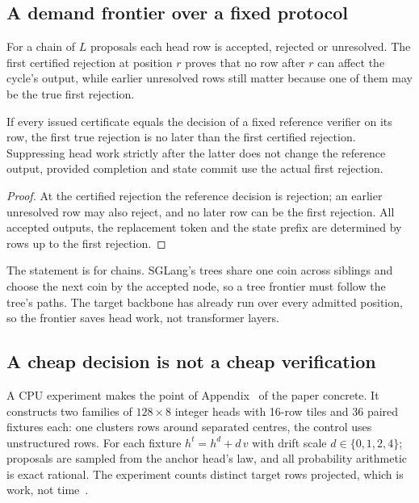 \subsection{A demand frontier over a fixed protocol}\label{app:frontier}\label{sec:frontier}
For a chain of $L$ proposals each head row is accepted, rejected or unresolved. The first certified rejection at position $r$ proves that no row after $r$ can affect the cycle's output, while earlier unresolved rows still matter because one of them may be the true first rejection.
\begin{proposition}\label{prop:frontier}
If every issued certificate equals the decision of a fixed reference verifier on its row, the first true rejection is no later than the first certified rejection. Suppressing head work strictly after the latter does not change the reference output, provided completion and state commit use the actual first rejection.
\end{proposition}
\begin{proof}
At the certified rejection the reference decision is rejection; an earlier unresolved row may also reject, and no later row can be the first rejection. All accepted outputs, the replacement token and the state prefix are determined by rows up to the first rejection.
\end{proof}
The statement is for chains. SGLang's trees share one coin across siblings and choose the next coin by the accepted node, so a tree frontier must follow the tree's paths. The target backbone has already run over every admitted position, so the frontier saves head work, not transformer layers.

\subsection{A cheap decision is not a cheap verification}\label{app:synthetic}\label{sec:synthetic}
A CPU experiment makes the point of Appendix~ of the paper concrete. It constructs two families of $128\times8$ integer heads with 16-row tiles and 36 paired fixtures each: one clusters rows around separated centres, the control uses unstructured rows. For each fixture $h^t=h^d+d\,v$ with drift scale $d\in\{0,1,2,4\}$; proposals are sampled from the anchor head's law, and all probability arithmetic is exact rational. The experiment counts distinct target rows projected, which is work, not time~.

